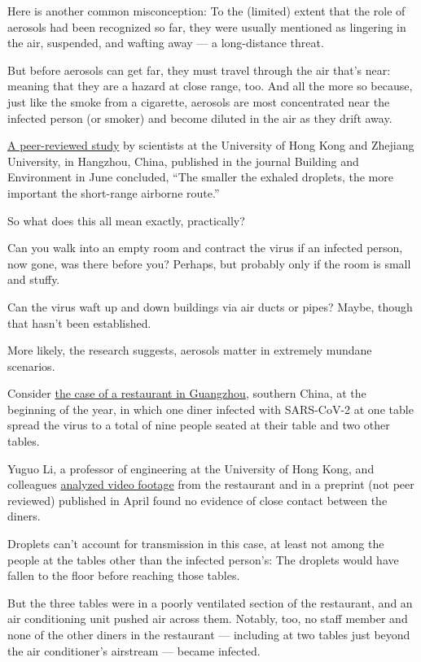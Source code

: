 Here is another common misconception: To the (limited) extent that the
role of aerosols had been recognized so far, they were usually mentioned
as lingering in the air, suspended, and wafting away --- a long-distance
threat.

But before aerosols can get far, they must travel through the air that's
near: meaning that they are a hazard at close range, too. And all the
more so because, just like the smoke from a cigarette, aerosols are most
concentrated near the infected person (or smoker) and become diluted in
the air as they drift away.

\href{https://www.sciencedirect.com/science/article/abs/pii/S0360132320302183?via\%3Dihub}{A
peer-reviewed study} by scientists at the University of Hong Kong and
Zhejiang University, in Hangzhou, China, published in the journal
Building and Environment in June concluded, ``The smaller the exhaled
droplets, the more important the short-range airborne route.''

So what does this all mean exactly, practically?

Can you walk into an empty room and contract the virus if an infected
person, now gone, was there before you? Perhaps, but probably only if
the room is small and stuffy.

Can the virus waft up and down buildings via air ducts or pipes? Maybe,
though that hasn't been established.

More likely, the research suggests, aerosols matter in extremely mundane
scenarios.

Consider
\href{https://www.nytimes.com/2020/04/20/health/airflow-coronavirus-restaurants.html}{the
case of a restaurant in Guangzhou}, southern China, at the beginning of
the year, in which one diner infected with SARS-CoV-2 at one table
spread the virus to a total of nine people seated at their table and two
other tables.

Yuguo Li, a professor of engineering at the University of Hong Kong, and
colleagues
\href{https://www.medrxiv.org/content/10.1101/2020.04.16.20067728v1}{analyzed
video footage} from the restaurant and in a preprint (not peer reviewed)
published in April found no evidence of close contact between the
diners.

Droplets can't account for transmission in this case, at least not among
the people at the tables other than the infected person's: The droplets
would have fallen to the floor before reaching those tables.

But the three tables were in a poorly ventilated section of the
restaurant, and an air conditioning unit pushed air across them.
Notably, too, no staff member and none of the other diners in the
restaurant --- including at two tables just beyond the air conditioner's
airstream --- became infected.

